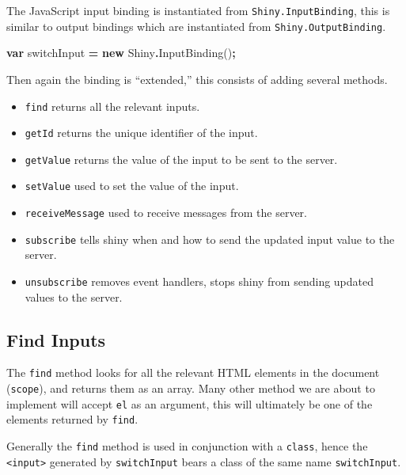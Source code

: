 \documentclass[
]{krantz}
\makeatletter
\newenvironment{Shaded}{\begin{snugshade}}{\end{snugshade}}
\newcommand{\FunctionTok}[1]{\textcolor[rgb]{0,0,0}{#1}}
\newcommand{\KeywordTok}[1]{\textcolor[rgb]{0.27,0.27,0.27}{\textbf{#1}}}
\newcommand{\NormalTok}[1]{#1}
\newcommand{\OperatorTok}[1]{\textcolor[rgb]{0.43,0.43,0.43}{\textbf{#1}}}
\providecommand{\tightlist}{%
  \setlength{\itemsep}{0pt}\setlength{\parskip}{0pt}}
\newenvironment{kframe}{%
\medskip{}
\setlength{\fboxsep}{.8em}
 \def\at@end@of@kframe{}%
 \ifinner\ifhmode%
  \def\at@end@of@kframe{\end{minipage}}%
  \begin{minipage}{\columnwidth}%
 \fi\fi%
 \def\FrameCommand##1{\hskip\@totalleftmargin \hskip-\fboxsep
 \colorbox{shadecolor}{##1}\hskip-\fboxsep
     \hskip-\linewidth \hskip-\@totalleftmargin \hskip\columnwidth}%
 \MakeFramed {\advance\hsize-\width
   \@totalleftmargin\z@ \linewidth\hsize
   \@setminipage}}%
 {\par\unskip\endMakeFramed%
 \at@end@of@kframe}
\renewenvironment{Shaded}{\begin{kframe}}{\end{kframe}}
\makeatother
\begin{document}
The JavaScript input binding is instantiated from \texttt{Shiny.InputBinding}, this is similar to output bindings which are instantiated from \texttt{Shiny.OutputBinding}.

\begin{Shaded}
\begin{Highlighting}[]
\KeywordTok{var}\NormalTok{ switchInput }\OperatorTok{=} \KeywordTok{new}\NormalTok{ Shiny}\OperatorTok{.}\FunctionTok{InputBinding}\NormalTok{()}\OperatorTok{;}
\end{Highlighting}
\end{Shaded}

Then again the binding is ``extended,'' this consists of adding several methods.

\begin{itemize}
\tightlist
\item
  \texttt{find} returns all the relevant inputs.
\item
  \texttt{getId} returns the unique identifier of the input.
\item
  \texttt{getValue} returns the value of the input to be sent to the server.
\item
  \texttt{setValue} used to set the value of the input.
\item
  \texttt{receiveMessage} used to receive messages from the server.
\item
  \texttt{subscribe} tells shiny when and how to send the updated input value to the server.
\item
  \texttt{unsubscribe} removes event handlers, stops shiny from sending updated values to the server.
\end{itemize}

\hypertarget{shiny-input-find}{%
\subsection{Find Inputs}\label{shiny-input-find}}

The \texttt{find} method looks for all the relevant HTML elements in the document (\texttt{scope}), and returns them as an array. Many other method we are about to implement will accept \texttt{el} as an argument, this will ultimately be one of the elements returned by \texttt{find}.

Generally the \texttt{find} method is used in conjunction with a \texttt{class}, hence the \texttt{\textless{}input\textgreater{}} generated by \texttt{switchInput} bears a class of the same name \texttt{switchInput}.
\end{document}

